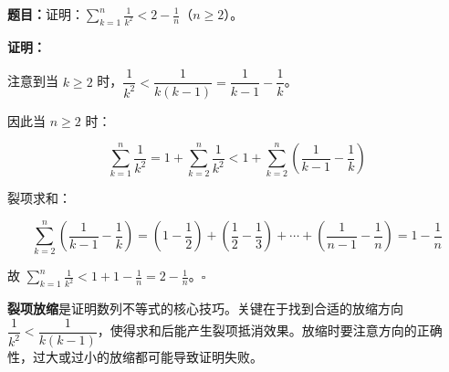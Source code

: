 \documentclass[12pt, a4paper]{ctexart}
\begin{document}
\begin{examplebox}[【例题10】构造函数证明数列不等式]
\textbf{题目：}证明：$\displaystyle\sum_{k=1}^{n} \frac{1}{k^2} < 2 - \frac{1}{n}$（$n \geq 2$）。

\medskip
\textbf{证明：}

注意到当 $k \geq 2$ 时，$\dfrac{1}{k^2} < \dfrac{1}{k(k-1)} = \dfrac{1}{k-1} - \dfrac{1}{k}$。

因此当 $n \geq 2$ 时：

$$\sum_{k=1}^{n} \frac{1}{k^2} = 1 + \sum_{k=2}^{n} \frac{1}{k^2} < 1 + \sum_{k=2}^{n} \left(\frac{1}{k-1} - \frac{1}{k}\right)$$

裂项求和：

$$\sum_{k=2}^{n} \left(\frac{1}{k-1} - \frac{1}{k}\right) = \left(1 - \frac{1}{2}\right) + \left(\frac{1}{2} - \frac{1}{3}\right) + \cdots + \left(\frac{1}{n-1} - \frac{1}{n}\right) = 1 - \frac{1}{n}$$

故 $\displaystyle\sum_{k=1}^{n} \frac{1}{k^2} < 1 + 1 - \frac{1}{n} = 2 - \frac{1}{n}$。\hfill$\square$
\end{examplebox}

\begin{tipbox}[方法总结]
\textbf{裂项放缩}是证明数列不等式的核心技巧。关键在于找到合适的放缩方向 $\dfrac{1}{k^2} < \dfrac{1}{k(k-1)}$，使得求和后能产生裂项抵消效果。放缩时要注意方向的正确性，过大或过小的放缩都可能导致证明失败。
\end{tipbox}
\end{document}
